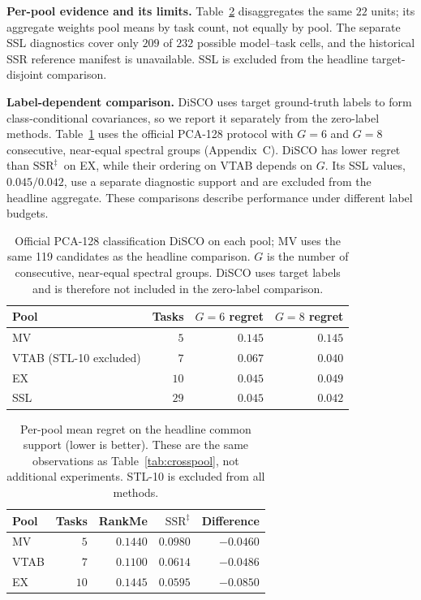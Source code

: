 \documentclass{article}
\newcommand{\SSRdag}{\ensuremath{\mathrm{SSR}^{\ddagger}}\xspace}
\begin{document}
\textbf{Per-pool evidence and its limits.} Table~\ref{tab:pool_regrets} disaggregates the same $22$ units; its aggregate weights pool means by task count, not equally by pool. The separate SSL diagnostics cover only $209$ of $232$ possible model--task cells, and the historical SSR reference manifest is unavailable. SSL is excluded from the headline target-disjoint comparison.

\textbf{Label-dependent comparison.} DiSCO uses target ground-truth labels to form class-conditional covariances, so we report it separately from the zero-label methods. Table~\ref{tab:official_disco} uses the official PCA-128 protocol with $G=6$ and $G=8$ consecutive, near-equal spectral groups (Appendix~C). DiSCO has lower regret than \SSRdag\ on EX, while their ordering on VTAB depends on $G$. Its SSL values, $0.045/0.042$, use a separate diagnostic support and are excluded from the headline aggregate. These comparisons describe performance under different label budgets.

\begin{table}[h]
\centering\small
\caption{Official PCA-128 classification DiSCO on each pool; MV uses the same 119 candidates as the headline comparison. $G$ is the number of consecutive, near-equal spectral groups. DiSCO uses target labels and is therefore not included in the zero-label comparison.}
\label{tab:official_disco}
\begin{tabular}{lrrr}
\toprule
Pool & Tasks & $G{=}6$ regret & $G{=}8$ regret \\
\midrule
MV   & $5$  & $0.145$ & $0.145$ \\
VTAB (STL-10 excluded) & $7$ & $0.067$ & $0.040$ \\
EX   & $10$ & $0.045$ & $0.049$ \\
SSL  & $29$ & $0.045$ & $0.042$ \\
\bottomrule
\end{tabular}
\end{table}

\begin{table}[h]
\centering\small
\caption{Per-pool mean regret on the headline common support (lower is better). These are the same observations as Table~\ref{tab:crosspool}, not additional experiments. STL-10 is excluded from all methods.}
\label{tab:pool_regrets}
\begin{tabular}{lrrrr}
\toprule
Pool & Tasks & RankMe & \SSRdag & Difference \\
\midrule
MV & $5$ & $0.1440$ & $0.0980$ & $-0.0460$ \\
VTAB & $7$ & $0.1100$ & $0.0614$ & $-0.0486$ \\
EX & $10$ & $0.1445$ & $0.0595$ & $-0.0850$ \\
\bottomrule
\end{tabular}
\end{table}
\end{document}
